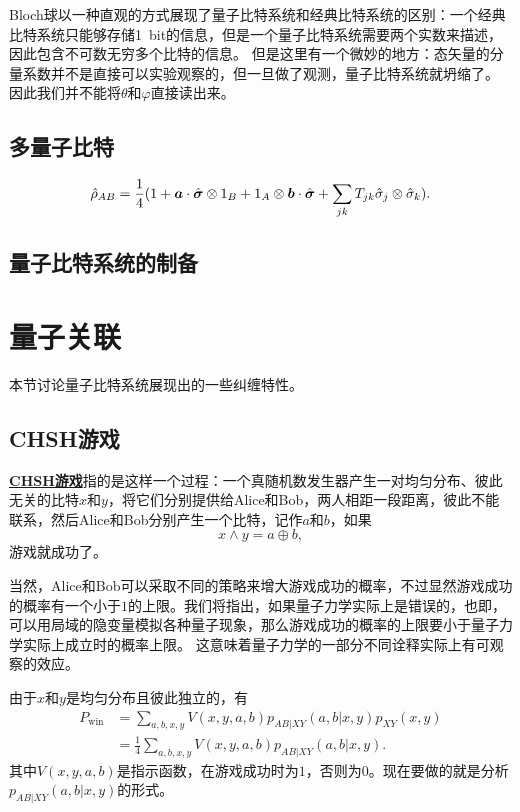 \documentclass[hyperref, UTF8, a4paper]{ctexart}
\newcommand*{\concept}[1]{\underline{\textbf{#1}}}
\begin{document}
Bloch球以一种直观的方式展现了量子比特系统和经典比特系统的区别：一个经典比特系统只能够存储\SI{1}{bit}的信息，但是一个量子比特系统需要两个实数来描述，因此包含不可数无穷多个比特的信息。
但是这里有一个微妙的地方：态矢量的分量系数并不是直接可以实验观察的，但一旦做了观测，量子比特系统就坍缩了。
因此我们并不能将$\theta$和$\varphi$直接读出来。

\subsection{多量子比特}

\begin{equation}
    \hat{\rho}_{AB} = \frac{1}{4} (1 + \vb*{a} \cdot \hat{\vb*{\sigma}} \otimes 1_B + 1_A \otimes \vb*{b} \cdot \hat{\vb*{\sigma}} + \sum_{jk} T_{jk} \hat{\sigma}_j \otimes \hat{\sigma}_k ).
\end{equation}

\subsection{量子比特系统的制备}

\section{量子关联}

本节讨论量子比特系统展现出的一些纠缠特性。%

\subsection{CHSH游戏}

\concept{CHSH游戏}指的是这样一个过程：一个真随机数发生器产生一对均匀分布、彼此无关的比特$x$和$y$，将它们分别提供给Alice和Bob，两人相距一段距离，彼此不能联系，然后Alice和Bob分别产生一个比特，记作$a$和$b$，如果
\begin{equation}
    x \land y = a \oplus b,
\end{equation}
游戏就成功了。

当然，Alice和Bob可以采取不同的策略来增大游戏成功的概率，不过显然游戏成功的概率有一个小于$1$的上限。我们将指出，如果量子力学实际上是错误的，也即，可以用局域的隐变量模拟各种量子现象，那么游戏成功的概率的上限要小于量子力学实际上成立时的概率上限。
这意味着量子力学的一部分不同诠释实际上有可观察的效应。

由于$x$和$y$是均匀分布且彼此独立的，有
\begin{equation}
    \begin{aligned}
        P_\text{win} &= \sum_{a, b, x, y} V(x, y, a, b) p_{AB|XY}(a, b | x, y) p_{XY}(x, y) \\
        &= \frac{1}{4} \sum_{a, b, x, y} V(x, y, a, b) p_{AB|XY}(a, b | x, y).
    \end{aligned}
\end{equation}
其中$V(x, y, a, b)$是指示函数，在游戏成功时为$1$，否则为$0$。现在要做的就是分析$p_{AB|XY}(a, b | x, y)$的形式。
\end{document}
